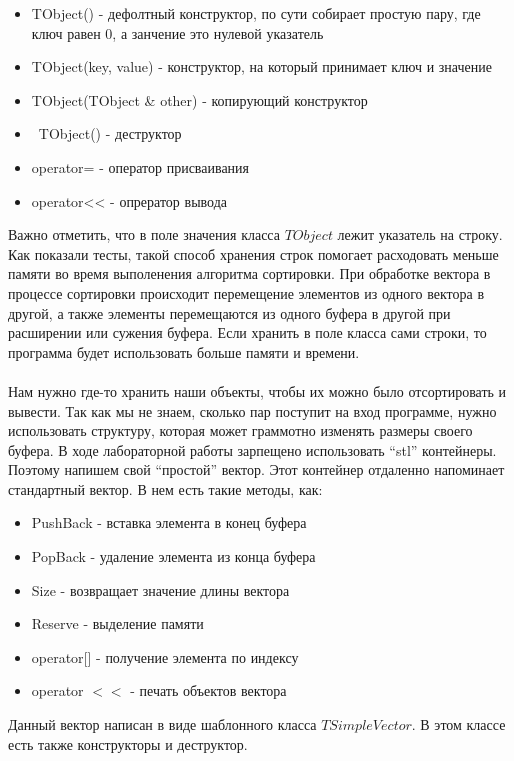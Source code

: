 \begin{itemize}
	\item TObject() - дефолтный конструктор, по сути собирает простую пару, где ключ равен 0, а занчение это нулевой указатель
	\item TObject(key, value) - конструктор, на который принимает ключ и значение
	\item TObject(TObject \& other) - копирующий конструктор
	\item ~TObject() - деструктор
	\item operator= - оператор присваивания
	\item operator<< - опрератор вывода
\end{itemize}


Важно отметить, что в поле значения класса $TObject$ лежит указатель на строку. Как показали тесты, 
такой способ хранения строк помогает расходовать меньше памяти во время выполенения алгоритма сортировки.
При обработке вектора в процессе сортировки происходит перемещение элементов из одного вектора в другой, 
а также элементы перемещаются из одного буфера в другой при расширении или сужения буфера. 
Если хранить в поле класса сами строки, то программа будет использовать больше памяти и времени.\\\\

Нам нужно где-то хранить наши объекты, чтобы их можно было отсортировать и вывести. Так как мы не знаем, 
сколько пар поступит на вход программе, нужно использовать структуру, которая может граммотно изменять размеры своего буфера.
В ходе лабораторной работы зарпещено использовать \enquote{stl} контейнеры. Поэтому напишем свой \enquote{простой} вектор.
Этот контейнер отдаленно напоминает стандартный вектор. В нем есть такие методы, как:\\

\begin{itemize}
	\item PushBack - вставка элемента в конец буфера
	\item PopBack - удаление элемента из конца буфера
	\item Size - возвращает значение длины вектора
	\item Reserve - выделение памяти
	\item operator[] - получение элемента по индексу
	\item operator \(<<\) - печать объектов вектора
\end{itemize} 


Данный вектор написан в виде шаблонного класса $TSimpleVector$. В этом классе есть также конструкторы и деструктор.

